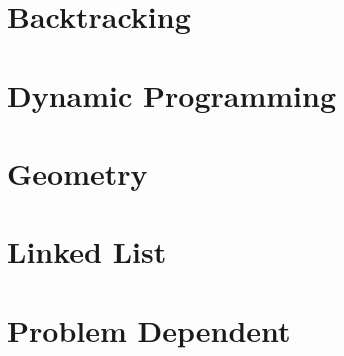 \documentclass[11pt]{article}
\begin{document}
\section{Backtracking}




\section{Dynamic Programming}





\section{Geometry}







\section{Linked List}







\section{Problem Dependent}
\end{document}

